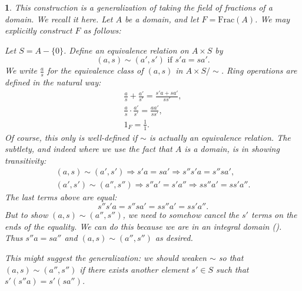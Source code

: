 \documentclass[12pt]{article}
\newtheorem{para}[theorem]{}
\begin{document}
\begin{para}
	This construction is a generalization of taking the field of fractions of a domain. We recall it here. Let $A$ be a domain, and let $F=\text{Frac}(A)$. We may explicitly construct $F$ as follows:

	Let $S=A-\{0\}$. Define an equivalence relation on $A\times S$ by 
	\begin{equation*}
		(a,s) \sim (a',s') \text{ if } s'a = sa'.
	\end{equation*}
	We write $\frac{a}{s}$ for the equivalence class of $(a,s)$ in $A\times S/\sim$. Ring operations are defined in the natural way:
	\begin{gather*}
		\frac{a}{s} + \frac{a'}{s'} = \frac{s'a + sa'}{ss'}, \\
		\frac{a}{s}\cdot\frac{a'}{s'} = \frac{aa'}{ss'}, \\
		1_F = \frac{1}{1}.
	\end{gather*}
	Of course, this only is well-defined if $\sim$ is actually an equivalence relation. The subtlety, and indeed where we use the fact that $A$ is a domain, is in showing transitivity:
	\begin{gather*}
		(a,s)\sim(a',s') \Rightarrow s'a = sa' \Rightarrow s''s'a = s''sa', \\
		(a',s')\sim (a'',s'') \Rightarrow s''a' = s'a'' \Rightarrow ss''a' = ss'a''.
	\end{gather*}
	The last terms above are equal: 
	\begin{equation*}
		s''s'a=s''sa'=ss''a'=ss'a''.
	\end{equation*}
	But to show $(a,s)\sim (a'',s'')$, we need to somehow cancel the $s'$ terms on the ends of the equality. We can do this because we are in an integral domain (). Thus $s''a=sa''$ and $(a,s)\sim(a'',s'')$ as desired.

	This might suggest the generalization: we should weaken $\sim$ so that $(a,s)\sim(a'',s'')$ if there exists another element $s'\in S$ such that $s'(s''a) = s'(sa'')$.
\end{para}
\end{document}
